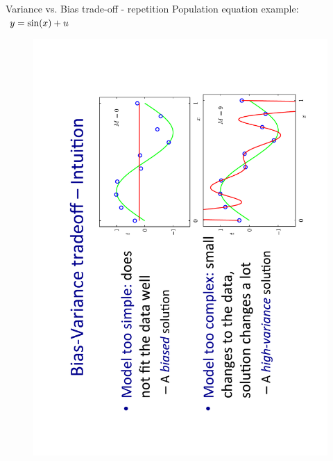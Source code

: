 \documentclass{beamer}
\begin{document}
\begin{frame}{Variance vs. Bias trade-off - repetition}
Population equation example: $~y = \textnormal{sin}(x)+u$
\vspace{-1cm}
\begin{figure}
\includegraphics[angle=270,scale=0.35]{IMG/VarBias.pdf}
\end{figure}
\end{frame}
\end{document}
